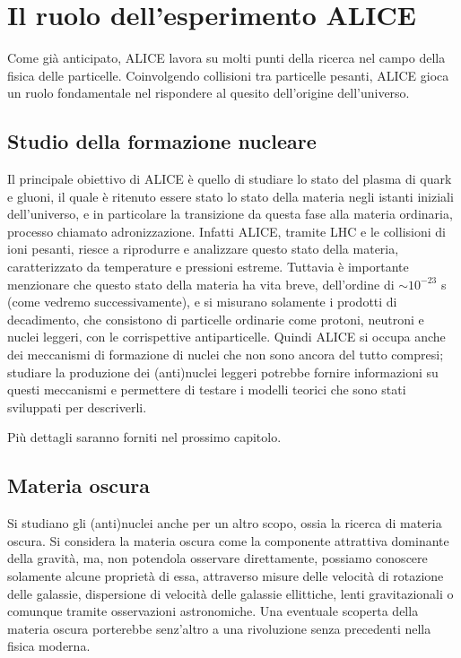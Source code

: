 \section{Il ruolo dell'esperimento ALICE}\label{ch:objectives_alice}
Come già anticipato, ALICE lavora su molti punti della ricerca nel campo della fisica delle particelle.
Coinvolgendo collisioni tra particelle pesanti, ALICE gioca un ruolo fondamentale nel rispondere al quesito dell'origine dell'universo.

\subsection{Studio della formazione nucleare}
Il principale obiettivo di ALICE è quello di studiare lo stato del plasma di quark e gluoni, il quale è ritenuto essere stato lo stato della materia negli istanti iniziali dell'universo, e in particolare la transizione da questa fase alla materia ordinaria, processo chiamato adronizzazione.
Infatti ALICE, tramite LHC e le collisioni di ioni pesanti, riesce a riprodurre e analizzare questo stato della materia, caratterizzato da temperature e pressioni estreme.
Tuttavia è importante menzionare che questo stato della materia ha vita breve, dell'ordine di $\sim10^{-23}$ s (come vedremo successivamente), e si misurano solamente i prodotti di decadimento, che consistono di particelle ordinarie come protoni, neutroni e nuclei leggeri, con le corrispettive antiparticelle.
Quindi ALICE si occupa anche dei meccanismi di formazione di nuclei che non sono ancora del tutto compresi; studiare la produzione dei (anti)nuclei leggeri potrebbe fornire informazioni su questi meccanismi e permettere di testare i modelli teorici che sono stati sviluppati per descriverli.

Più dettagli saranno forniti nel prossimo capitolo.

\subsection{Materia oscura}
Si studiano gli (anti)nuclei anche per un altro scopo, ossia la ricerca di materia oscura.
Si considera la materia oscura come la componente attrattiva dominante della gravità, ma, non potendola osservare direttamente, possiamo conoscere solamente alcune proprietà di essa, attraverso misure delle velocità di rotazione delle galassie, dispersione di velocità delle galassie ellittiche, lenti gravitazionali o comunque tramite osservazioni astronomiche.
Una eventuale scoperta della materia oscura porterebbe senz'altro a una rivoluzione senza precedenti nella fisica moderna.

